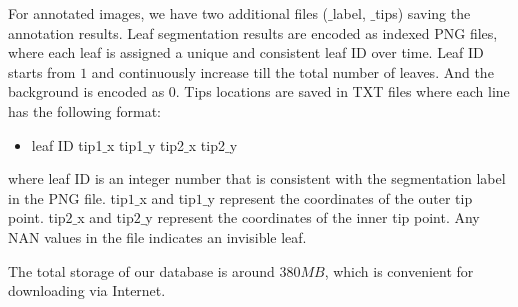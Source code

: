 For annotated images, we have two additional files ($\_$label, $\_$tips) saving the annotation results.
Leaf segmentation results are encoded as indexed PNG files, where each leaf is assigned a unique and consistent leaf ID over time.
Leaf ID starts from $1$ and continuously increase till the total number of leaves.
And the background is encoded as $0$.
Tips locations are saved in TXT files where each line has the following format:
\begin{itemize}
\item leaf ID \quad tip1$\_$x \quad tip1$\_$y \quad tip2$\_$x \quad tip2$\_$y
\end{itemize}
where leaf ID is an integer number that is consistent with the segmentation label in the PNG file.
tip$1\_$x and tip$1\_$y represent the coordinates of the outer tip point.
tip$2\_$x and tip$2\_$y represent the coordinates of the inner tip point.
Any NAN values in the file indicates an invisible leaf. 


The total storage of our database is around $380 MB$, which is convenient for downloading via Internet.

